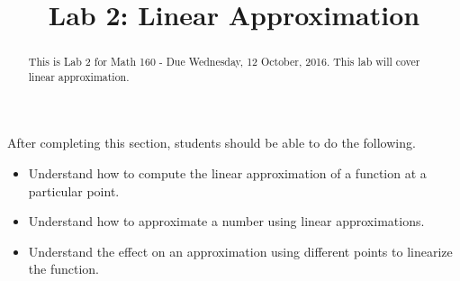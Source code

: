 \documentclass{ximera}
\title{Lab 2: Linear Approximation}
\begin{document}
\begin{abstract}
This is Lab 2 for Math 160 - Due Wednesday, 12 October, 2016. This lab will cover linear approximation.
\end{abstract}

\maketitle

\begin{sectionOutcomes}

After completing this section, students should be able to do the following.

\begin{itemize}
	\item Understand how to compute the linear approximation of a function at a particular point.
    \item Understand how to approximate a number using linear approximations.
    \item Understand the effect on an approximation using different points to linearize the function.
\end{itemize}

\end{sectionOutcomes}
\end{document}
